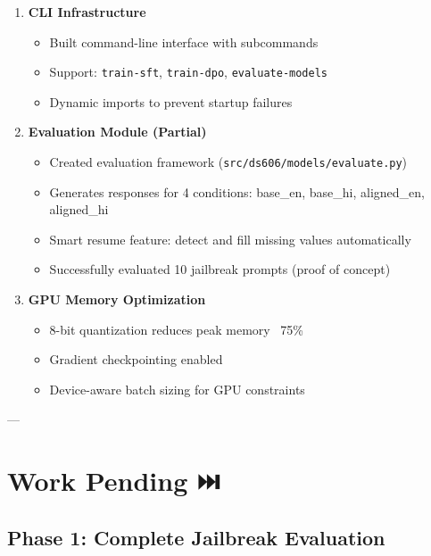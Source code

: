 \documentclass[11pt,a4paper]{article}
\begin{document}
\begin{enumerate}
    \item[\textcolor{completed}{✓}] \textbf{CLI Infrastructure}
    \begin{itemize}
        \item Built command-line interface with subcommands
        \item Support: \texttt{train-sft}, \texttt{train-dpo}, \texttt{evaluate-models}
        \item Dynamic imports to prevent startup failures
    \end{itemize}

    \item[\textcolor{completed}{✓}] \textbf{Evaluation Module (Partial)}
    \begin{itemize}
        \item Created evaluation framework (\texttt{src/ds606/models/evaluate.py})
        \item Generates responses for 4 conditions: base\_en, base\_hi, aligned\_en, aligned\_hi
        \item Smart resume feature: detect and fill missing values automatically
        \item Successfully evaluated 10 jailbreak prompts (proof of concept)
    \end{itemize}

    \item[\textcolor{completed}{✓}] \textbf{GPU Memory Optimization}
    \begin{itemize}
        \item 8-bit quantization reduces peak memory ~75\%
        \item Gradient checkpointing enabled
        \item Device-aware batch sizing for GPU constraints
    \end{itemize}
\end{enumerate}

---

\section{Work Pending ⏭️}

\subsection{Phase 1: Complete Jailbreak Evaluation}
\end{document}
